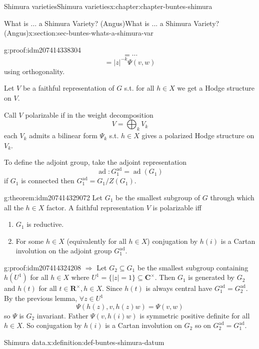 \documentclass[oneside,10pt,]{book}
\numberwithin{equation}{section}
\newcommand{\RR}{\mathbf{R}}
\newcommand{\CC}{\mathbf{C}}
\DeclareMathOperator{\ad}{ad}
\begin{document}
\begin{chapterptx}{Shimura varieties}{}{Shimura varieties}{}{}{x:chapter:chapter-buntes-shimura}
\begin{sectionptx}{What is ... a Shimura Variety? (Angus)}{}{What is ... a Shimura Variety? (Angus)}{}{}{x:section:sec-buntes-whats-a-shimura-var}
\begin{proofptx}{}{g:proof:idm207414338304}
\begin{equation*}
= \cdots
\end{equation*}
%
\begin{equation*}
= |z|^{-k} \Psi(v,w)
\end{equation*}
using orthogonality.%
\end{proofptx}
Let \(V \) be a faithful representation of \(G \) s.t. for all \(h\in X\) we get  a Hodge structure on \(V\).%
\par
Call \(V\) polarizable if in the weight decomposition%
\begin{equation*}
V = \bigoplus_k V_k
\end{equation*}
each \(V_k\) admits a bilinear form \(\Psi_k\) s.t. \(h \in X\) gives a polarized Hodge structure on \(V_k\).%
\par
To define the adjoint group, take the adjoint representation%
\begin{equation*}
\ad \colon G_1^{\ad} = \ad(G_1)
\end{equation*}
if \(G_1\) is connected then \(G_1^{\ad} = G_1 /Z(G_1)\).%
\begin{theorem}{}{}{g:theorem:idm207414329072}%
Let \(G_1\) be the smallest subgroup of \(G\) through  which all the \(h \in X\) factor. A faithful representation \(V\) is polarizable iff%
\begin{enumerate}
\item{}\(G_1\) is reductive.%
\item{}For some \(h \in X\) (equivalently for all \(h \in X\)) conjugation by \(h(i)\) is a Cartan involution on the adjoint group \(G_1^{\ad}\).%
\end{enumerate}
%
\end{theorem}
\begin{proofptx}{}{g:proof:idm207414324208}
\(\Rightarrow\) Let \(G_2 \subseteq G_1\) be the smallest subgroup containing \(h(U^1)\) for all \(h \in X\) where \(U^1 = \{|z| = 1\} \subseteq \CC^\times\). Then \(G_1\) is generated by \(G_2\) and \(h(t)\) for all \(t \in \RR^\times, h \in X\). Since \(h(t)\) is always central have \(G_1^{\ad}=  G_2^{\ad}\). By the previous lemma, \(\forall z  \in U^1\)%
\begin{equation*}
\Psi(h(z), v, h(z) w) = \Psi(v,w)
\end{equation*}
so \(\Psi\) is \(G_2\) invariant. Father \(\Psi(v, h(i) w)\) is symmetric positive definite for all \(h \in X\). So conjugation by \(h(i)\) is a Cartan involution on \(G_2\) so on \(G_2^{\ad} = G_1^{\ad}\).%
\end{proofptx}
\begin{definition}{Shimura data.}{x:definition:def-buntes-shimura-datum}%

\end{definition}
\end{sectionptx}
\end{chapterptx}
\end{document}
